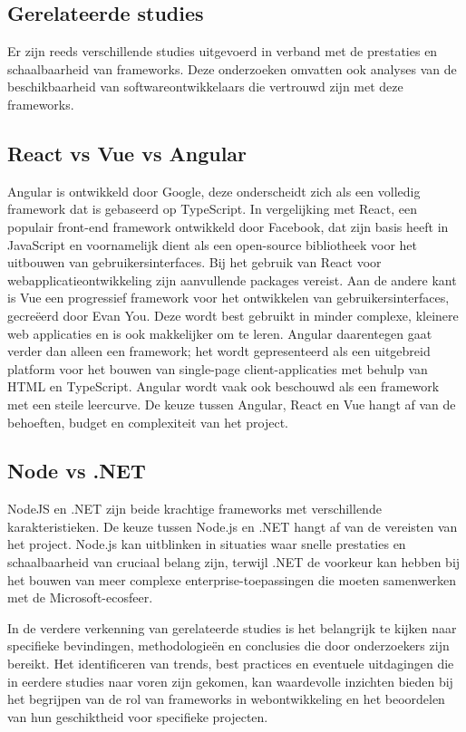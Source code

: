\subsection{Ge\-rel\-at\-eerde studies}%
\label{sub:Gerelateerde_studies}
Er zijn reeds verschillende studies uitgevoerd in verband met de pre\-sta\-ties en schaalbaarheid van frameworks\autocite{Daityari2023}.  Deze onderzoeken omvatten ook analyses van de beschikbaarheid van soft\-ware\-ont\-wik\-kel\-aars die vertrouwd zijn met deze frameworks.

\subsection{React vs Vue vs Angular}%
Angular is ontwikkeld door Google, deze onderscheidt zich als een volledig
framework dat is gebaseerd op TypeScript. In vergelijking met React, een
populair front-end framework ontwikkeld door Facebook, dat zijn basis heeft in
JavaScript en voornamelijk dient als een open-source bibliotheek voor het
uitbouwen van gebruikersinterfaces. Bij het gebruik van React voor
webapplicatieontwikkeling zijn aanvullende packages vereist. Aan de andere kant
is Vue een progressief framework voor het ontwikkelen van gebruikersinterfaces,
gecreëerd door Evan You.\autocite{EvanYou2024} Deze wordt best gebruikt in
minder complexe, kleinere web applicaties en is ook makkelijker om te leren.
Angular daarentegen gaat verder dan alleen een framework; het wordt
gepresenteerd als een uitgebreid platform voor het bouwen van single-page
client-applicaties met behulp van HTML en TypeScript. Angular wordt vaak ook
beschouwd als een framework met een steile leercurve. De keuze tussen Angular,
React en Vue hangt af van de behoeften, budget en complexiteit van het
project.\autocite{Joshi2023}

\subsection{Node vs .NET}%
NodeJS en .NET zijn beide krachtige frameworks met verschillende
karakteristieken. De keuze tussen Node.js en .NET hangt af van de vereisten van
het project. Node.js kan uitblinken in situaties waar snelle prestaties en
schaalbaarheid van cruciaal belang zijn, terwijl .NET de voorkeur kan hebben
bij het bouwen van meer complexe enterprise-toepassingen die moeten samenwerken
met de Microsoft-ecosfeer. \autocite{Hutsulyak2023}

\bigbreak
In de verdere verkenning van ge\-rel\-a\-teer\-de studies is het belangrijk te kijken naar specifieke bevindingen, methodologieën en conclusies die door onderzoekers zijn bereikt. Het identificeren van trends, best practices en e\-ven\-tu\-ele uitdagingen die in eerdere studies naar voren zijn gekomen, kan waardevolle inzichten bieden bij het begrijpen van de rol van frameworks in webontwikkeling en het beoordelen van hun geschiktheid voor specifieke projecten.

\lipsum[7-20]
